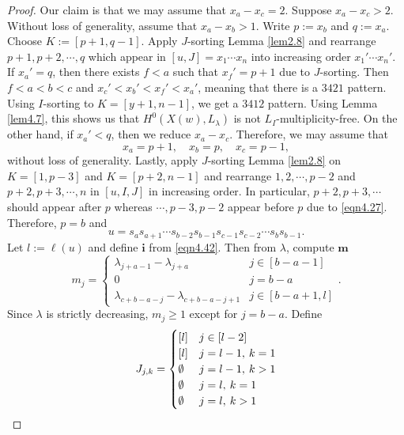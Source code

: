 \documentclass[12pt]{amsart}
\theoremstyle{definition}
\theoremstyle{remark}
\newcommand{\hsp}{\hspace{0.2em}}
\begin{document}
\begin{proof}
Our claim is that we may assume that $x_a - x_c = 2$. Suppose $x_a - x_c >2$. Without loss of generality, assume that $x_a - x_b > 1$. Write $p:=x_b$ and $q:=x_a$. Choose $K := [p +1, q -1]$. Apply $J$-sorting Lemma \ref{lem2.8} and rearrange $p+1 , p+2 , \cdots , q$ which appear in $[u,J]=x_1 \cdots x_n$ into increasing order $x_1' \cdots x_n'$. If $x_a' = q$, then there exists $f<a$ such that $x_f' = p+1$ due to $J$-sorting. Then $f<a<b<c$ and $x_c' < x_b' < x_f' < x_a'$, meaning that there is a $3421$ pattern. Using $I$-sorting to $K = [y+1 , n-1]$, we get a $3412$ pattern. Using Lemma \ref{lem4.7}, this shows us that $H^0(X(w) , L_\lambda)$ is not $L_I$-multiplicity-free. On the other hand, if $x_a' < q$, then we reduce $x_a - x_c$. Therefore, we may assume that
\begin{equation}\label{eqn4.29}
x_a = p+1 , \quad x_b = p , \quad x_c = p-1,
\end{equation}
without loss of generality. Lastly, apply $J$-sorting Lemma \ref{lem2.8} on $K = [1, p-3]$ and $K=[p+2 , n-1]$ and rearrange $1,2, \cdots , p-2$ and $p+2 , p+3 , \cdots , n$ in $[u,I,J]$ in increasing order. In particular, $p+2 , p+3, \cdots $ should appear after $p$ whereas $\cdots , p-3 , p-2$ appear before $p$ due to \eqref{eqn4.27}. Therefore, $p = b$ and
\begin{equation}\label{eqn4.42}
u = s_a s_{a+1} \cdots s_{b-2}s_{b-1} s_{c-1} s_{c-2} \cdots s_{b}s_{b-1}.
\end{equation}
Let $l:= \ell (u)$ and define $\mathbf{i}$ from \eqref{eqn4.42}. Then from $\lambda$, compute $\mathbf{m}$
\begin{equation}\label{eqn4.43}
m_j = 
\begin{cases}
\lambda_{j+a-1}- \lambda_{j+a} & j \in [b-a-1] \\
0 & j =b-a \\
\lambda_{c+b-a-j} - \lambda_{c+b-a-j+1} & j \in [b-a+1 , l]
\end{cases}
.
\end{equation}
Since $\lambda$ is strictly decreasing, $m_j \geq 1$ except for $j = b-a$. Define
\begin{equation}\label{eqn4.44}
J_{j,k} = 
\begin{cases}
[l] & j \in [l-2] \\
[l] & j =l-1, \hsp k=1 \\
\emptyset & j = l-1 , \hsp k>1 \\
\emptyset & j = l, \hsp k=1 \\
\emptyset & j=l, \hsp k>1
\end{cases}

\end{equation}
\end{proof}
\end{document}
